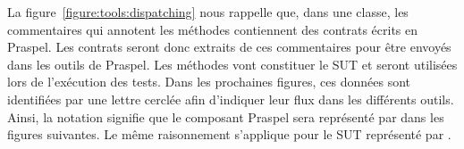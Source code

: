 La figure~\ref{figure:tools:dispatching} nous rappelle que, dans une classe, les
commentaires qui annotent les méthodes contiennent des contrats écrits en
Praspel. Les contrats seront donc extraits de ces commentaires pour être envoyés
dans les outils de Praspel. Les méthodes vont constituer le SUT et seront
utilisées lors de l'exécution des tests. Dans les prochaines figures, ces
données sont identifiées par une lettre cerclée afin d'indiquer leur flux dans
les différents outils. Ainsi, la notation %
signifie que le composant Praspel sera représenté par  dans les
figures suivantes. Le même raisonnement s'applique pour le SUT représenté par
.


